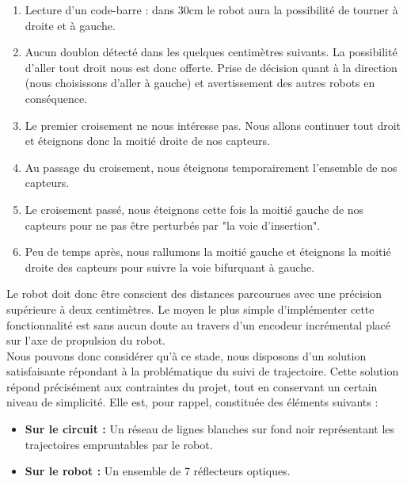 
		\begin{enumerate}
			\item Lecture d'un code-barre : dans 30cm le robot aura la possibilité de tourner à droite et à gauche.
			\item Aucun doublon détecté dans les quelques centimètres suivants. La possibilité d'aller tout droit nous est donc offerte. Prise de décision quant à la direction (nous choisissons d'aller à gauche) et avertissement des autres robots en conséquence.
			\item Le premier croisement ne nous intéresse pas. Nous allons continuer tout droit et éteignons donc la moitié droite de nos capteurs.
			\item Au passage du croisement, nous éteignons temporairement l'ensemble de nos capteurs.
			\item Le croisement passé, nous éteignons cette fois la moitié gauche de nos capteurs pour ne pas être perturbés par "la voie d'insertion".
			\item Peu de temps après, nous rallumons la moitié gauche et éteignons la moitié droite des capteurs pour suivre la voie bifurquant à gauche.
		\end{enumerate}

		Le robot doit donc être conscient des distances parcourues avec une précision supérieure à deux centimètres. Le moyen le plus simple d'implémenter cette fonctionnalité est sans aucun doute au travers d'un encodeur incrémental placé sur l'axe de propulsion du robot.\\

		Nous pouvons donc considérer qu'à ce stade, nous disposons d'un solution satisfaisante répondant à la problématique du suivi de trajectoire.
		Cette solution répond précisément aux contraintes du projet, tout en conservant un certain niveau de simplicité. Elle est, pour rappel, constituée des éléments suivants :\\

		\begin{itemize}
			\item \textbf{Sur le circuit :} Un réseau de lignes blanches sur fond noir représentant les trajectoires empruntables par le robot.
			\item \textbf{Sur le robot :} Un ensemble de 7 réflecteurs optiques.
		\end{itemize}

